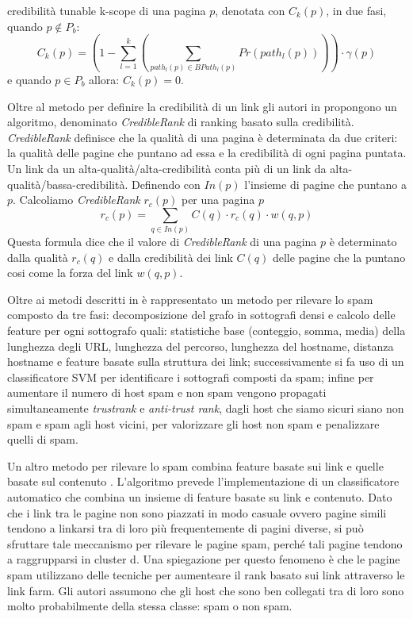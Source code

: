 credibilità tunable k-scope di una pagina \(p\), denotata con \(C_k(p)\), in due fasi, quando \(p \not \in P_b\):
\begin{equation} 
C_k(p)=\left ( 1 -\sum_{l=1}^k \left ( \sum_{path_l(p)\in BPath_l(p)} Pr(path_l(p)) \right ) \right ) \cdot\gamma(p)
\end{equation}
e quando \(p\in P_b\) allora: \(C_k(p)=0\).

Oltre al metodo per definire la credibilità di un link gli autori in \cite{Caverlee:2007:CWS:1281100.1281124} propongono un algoritmo, denominato \textit{CredibleRank} di ranking basato sulla credibilità. \textit{CredibleRank} definisce che la qualità di una pagina è determinata da due criteri: la qualità delle pagine che puntano ad essa e la credibilità di ogni pagina puntata. Un link da un alta-qualità/alta-credibilità conta più di un link da alta-qualità/bassa-credibilità. Definendo con \(In(p)\) l'insieme di pagine che puntano a \(p\). Calcoliamo \textit{CredibleRank} \(r_c(p)\) per una pagina \(p\)
\begin{equation}
r_c(p)=\sum_{q\in In(p)}C(q)\cdot r_c(q)\cdot w(q,p)
\end{equation}
Questa formula dice che il valore di \textit{CredibleRank} di una pagina \(p\) è determinato dalla qualità \(r_c(q)\) e dalla credibilità dei link \(C(q)\) delle pagine che la puntano cosi come la forza del link \(w(q,p)\).

Oltre ai metodi descritti in \cite{Leon-Suematsu:2011:WSD:2052138.2052339} è rappresentato un metodo per rilevare lo spam composto da tre fasi: decomposizione del grafo in sottografi densi e calcolo delle feature per ogni sottografo quali: statistiche base (conteggio, somma, media) della lunghezza degli URL, lunghezza del percorso, lunghezza del hostname, distanza hostname e feature basate sulla struttura dei link; successivamente si fa uso di un classificatore SVM  per identificare i sottografi composti da spam; infine per aumentare il numero di host spam e non spam vengono propagati simultaneamente \textit{trustrank} e \textit{anti-trust rank}, dagli host che siamo sicuri siano non spam e spam agli host vicini, per valorizzare gli host non spam e penalizzare quelli di spam.

Un altro metodo per rilevare lo spam combina feature basate sui link e quelle basate sul contenuto \cite{Castillo:2007:KYN:1277741.1277814}. L'algoritmo prevede l'implementazione di un classificatore automatico che combina un insieme di feature basate su link e contenuto. Dato che i link tra le pagine non sono piazzati in modo casuale ovvero pagine simili tendono a linkarsi tra di loro più frequentemente di pagini diverse, si può sfruttare tale meccanismo per rilevare le pagine spam, perché tali pagine tendono a raggrupparsi in cluster d. Una spiegazione per questo fenomeno è che le pagine spam utilizzano delle tecniche per aumenteare il rank basato sui link attraverso le link farm. Gli autori assumono che gli host che sono ben collegati tra di loro sono molto probabilmente della stessa classe: spam o non spam.

